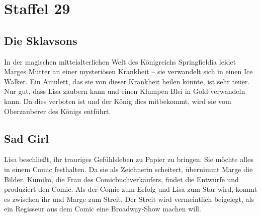 

\section{Staffel 29}

\subsection{Die Sklavsons}\label{WABF17}
In der magischen mittelalterlichen Welt des Königreichs Springfieldia leidet Marges Mutter an einer mysteriösen Krankheit -- sie verwandelt sich in einen \glqq Ice Walker\grqq. Ein Amulett, das sie von dieser Krankheit heilen könnte, ist sehr teuer. Nur gut, dass Lisa zaubern kann und einen Klumpen Blei in Gold verwandeln kann. Da dies verboten ist und der König dies mitbekommt, wird sie vom Oberzauberer des Königs entführt.


\subsection{Sad Girl}
Lisa beschließt, ihr trauriges Gefühlsleben zu Papier zu bringen. Sie möchte alles in einem Comic festhalten. Da sie als Zeichnerin scheitert, übernimmt Marge die Bilder. Kumiko, die Frau des Comicbuchverkäufers, findet die Entwürfe und produziert den Comic. Als der Comic zum Erfolg und Lisa zum Star wird, kommt es zwischen ihr und Marge zum Streit. Der Streit wird vermeintlich beigelegt, als ein Regisseur aus dem Comic eine Broadway-Show machen will.


